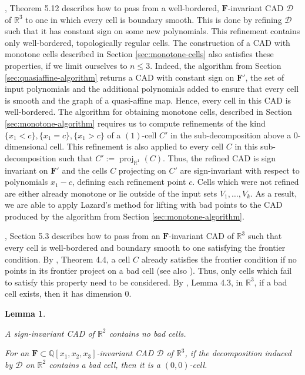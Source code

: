 \documentclass[
]{book}
\newtheorem{lemma}{Lemma}[chapter]
\theoremstyle{definition}
\theoremstyle{definition}
\theoremstyle{definition}
\theoremstyle{definition}
\theoremstyle{remark}
\begin{document}
\citet{lazard10}, Theorem 5.12 describes how to pass from a well-bordered, \(\mathbf{F}\)-invariant CAD \(\mathcal{D}\) of \(\mathbb{R}^3\) to one in which every cell is boundary smooth. This is done by refining \(\mathcal{D}\) such that it has constant sign on some new polynomials. This refinement contains only well-bordered, topologically regular cells.
The construction of a CAD with monotone cells described in Section \ref{sec:monotone-cells} also satisfies these properties, if we limit ourselves to \(n\le3\). Indeed, the algorithm from Section \ref{sec:quasiaffine-algorithm} returns a CAD with constant sign on \(\mathbf{F'}\), the set of input polynomials and the additional polynomials added to ensure that every cell is smooth and the graph of a quasi-affine map. Hence, every cell in this CAD is well-bordered. The algorithm for obtaining monotone cells, described in Section \ref{sec:monotone-algorithm} requires us to compute refinements of the kind \(\{ x_1 < c \}, \{ x_1 = c \}, \{ x_1 > c \}\) of a \((1)\)-cell \(C'\) in the sub-decomposition above a 0-dimensional cell.
This refinement is also applied to every cell \(C\) in this sub-decomposition such that \(C' := {\operatorname{proj}_{\mathbb{R}^{1}}}(C)\). Thus, the refined CAD is sign invariant on \(\mathbf{F'}\) and the cells \(C\) projecting on \(C'\) are sign-invariant with respect to polynomials \(x_1 - c\), defining each refinement point \(c\).
Cells which were not refined are either already monotone or lie outside of the input sets \(V_1,\ldots,V_k\).
As a result, we are able to apply Lazard's method for lifting with bad points to the CAD produced by the algorithm from Section \ref{sec:monotone-algorithm}.

\citet{lazard10}, Section 5.3 describes how to pass from an \(\mathbf{F}\)-invariant CAD of \(\mathbb{R}^3\) such that every cell is well-bordered and boundary smooth to one satisfying the frontier condition.
By \citet{lazard10}, Theorem 4.4, a cell \(C\) already satisfies the frontier condition if no points in its frontier project on a bad cell (see also \citet{jhd20}).
Thus, only cells which fail to satisfy this property need to be considered. By \citet{lazard10}, Lemma 4.3, in \(\mathbb{R}^3\), if a bad cell exists, then it has dimension \(0\).

\begin{lemma}
\protect\hypertarget{lem:only-bad-zero-cells}{}\label{lem:only-bad-zero-cells}\citep[Lemma 4.3]{lazard10}

A sign-invariant CAD of \(\mathbb{R}^2\) contains no bad cells.

For an \(\mathbf{F} \subset \mathbb{Q}[x_1,x_2,x_3]\)-invariant CAD \(\mathcal{D}\) of \(\mathbb{R}^3\), if the decomposition induced by \(\mathcal{D}\) on \(\mathbb{R}^2\) contains a bad cell, then it is a \((0,0)\)-cell.
\end{lemma}
\end{document}
